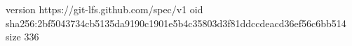 version https://git-lfs.github.com/spec/v1
oid sha256:2bf5043734cb5135da9190c1901e5b4c35803d3f81ddccdeacd36ef56c6bb514
size 336
